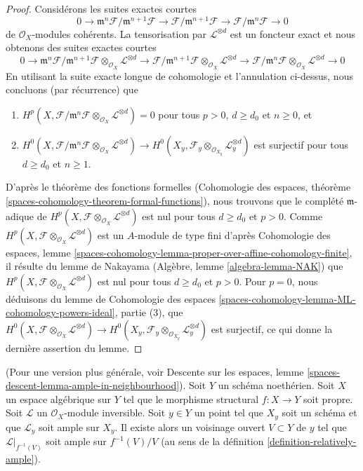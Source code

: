 \begin{proof}
\medskip\noindent
Considérons les suites exactes courtes
$$
0 \to \mathfrak m^n\mathcal{F}/\mathfrak m^{n + 1} \mathcal{F}
\to \mathcal{F}/\mathfrak m^{n + 1} \mathcal{F}
\to \mathcal{F}/\mathfrak m^n \mathcal{F} \to 0
$$
de $\mathcal{O}_X$-modules cohérents. La tensorisation par $\mathcal{L}^{\otimes d}$
est un foncteur exact et nous obtenons des suites exactes courtes
$$
0 \to
\mathfrak m^n\mathcal{F}/\mathfrak m^{n + 1} \mathcal{F}
\otimes_{\mathcal{O}_X} \mathcal{L}^{\otimes d}
\to \mathcal{F}/\mathfrak m^{n + 1} \mathcal{F}
\otimes_{\mathcal{O}_X} \mathcal{L}^{\otimes d}
\to \mathcal{F}/\mathfrak m^n \mathcal{F}
\otimes_{\mathcal{O}_X} \mathcal{L}^{\otimes d} \to 0
$$
En utilisant la suite exacte longue de cohomologie et l'annulation ci-dessus,
nous concluons (par récurrence) que
\begin{enumerate}
\item $H^p(X, \mathcal{F}/\mathfrak m^n \mathcal{F}
\otimes_{\mathcal{O}_X} \mathcal{L}^{\otimes d}) = 0$
pour tous $p > 0$, $d \geq d_0$ et $n \geq 0$, et
\item $H^0(X, \mathcal{F}/\mathfrak m^n \mathcal{F}
\otimes_{\mathcal{O}_X} \mathcal{L}^{\otimes d}) \to
H^0(X_y, \mathcal{F}_y \otimes_{\mathcal{O}_{X_y}} \mathcal{L}_y^{\otimes d})$
est surjectif pour tous $d \geq d_0$ et $n \geq 1$.
\end{enumerate}
D'après le théorème des fonctions formelles
(Cohomologie des espaces, théorème
\ref{spaces-cohomology-theorem-formal-functions}),
nous trouvons que le complété $\mathfrak m$-adique de
$H^p(X, \mathcal{F} \otimes_{\mathcal{O}_X} \mathcal{L}^{\otimes d})$
est nul pour tous $d \geq d_0$ et $p > 0$.
Comme $H^p(X, \mathcal{F} \otimes_{\mathcal{O}_X} \mathcal{L}^{\otimes d})$
est un $A$-module de type fini d'après
Cohomologie des espaces, lemme
\ref{spaces-cohomology-lemma-proper-over-affine-cohomology-finite},
il résulte du lemme de Nakayama (Algèbre, lemme \ref{algebra-lemma-NAK})
que $H^p(X, \mathcal{F} \otimes_{\mathcal{O}_X} \mathcal{L}^{\otimes d})$
est nul pour tous $d \geq d_0$ et $p > 0$.
Pour $p = 0$, nous déduisons du
lemme de Cohomologie des espaces
\ref{spaces-cohomology-lemma-ML-cohomology-powers-ideal}, partie (3),
que $H^0(X, \mathcal{F} \otimes_{\mathcal{O}_X} \mathcal{L}^{\otimes d}) \to
H^0(X_y, \mathcal{F}_y \otimes_{\mathcal{O}_{X_y}} \mathcal{L}_y^{\otimes d})$
est surjectif, ce qui donne la dernière assertion du lemme.
\end{proof}

\begin{lemma}
\label{lemma-ample-in-neighbourhood}
(Pour une version plus générale, voir
Descente sur les espaces, lemme \ref{spaces-descent-lemma-ample-in-neighbourhood}).
Soit $Y$ un schéma noethérien. Soit $X$ un espace algébrique sur $Y$
tel que le morphisme structural $f : X \to Y$ soit propre.
Soit $\mathcal{L}$ un $\mathcal{O}_X$-module inversible.
Soit $y \in Y$ un point tel que $X_y$ soit un schéma et que
$\mathcal{L}_y$ soit ample sur $X_y$.
Il existe alors un voisinage ouvert $V \subset Y$
de $y$ tel que $\mathcal{L}|_{f^{-1}(V)}$ soit ample sur $f^{-1}(V)/V$
(au sens de la définition \ref{definition-relatively-ample}).
\end{lemma}


